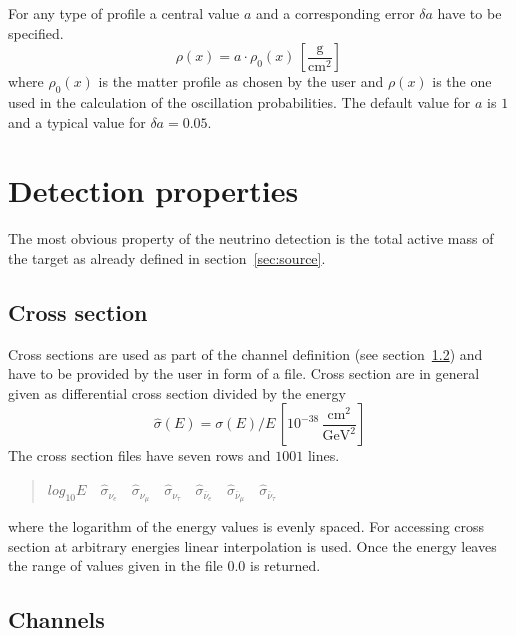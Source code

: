 For any type of profile a central value $a$ and a corresponding error 
$\delta a$ have to be specified.
\begin{equation}
\label{eq:density_error}
\rho(x)=a\cdot\rho_0(x)\,\left[\frac{\mathrm{g}}{\mathrm{cm}^2}\right]\,
\end{equation}
where $\rho_0(x)$ is the matter profile as chosen by the user and $\rho(x)$ is
the one used in the calculation of the oscillation probabilities. The default
value for $a$ is $1$ and a typical value for $\delta a = 0.05$. 


\section{Detection properties}

The most obvious property of the neutrino detection is the total
active mass of the target as already defined in section~\ref{sec:source}.

\subsection{Cross section}
\label{sec:cross_section}

Cross sections are used as part of the 
channel definition 
(see section~\ref{sec:channel}) and have to be provided by the user in form
of a file. Cross section are in general given as differential cross section
divided by the energy
\begin{equation}
\hat\sigma(E)=\sigma(E)/E\,\left[ 10^{-38}\,
\frac{\mathrm{cm}^2}{\mathrm{GeV}^2} \right]
\end{equation}
The cross section files have seven rows and $1001$ lines.
\begin{quotation}
$log_{10} E\quad
\hat\sigma_{\nu_e}\quad
\hat\sigma_{\nu_\mu}\quad
\hat\sigma_{\nu_\tau}\quad
\hat\sigma_{\bar\nu_e}\quad
\hat\sigma_{\bar\nu_\mu}\quad
\hat\sigma_{\bar\nu_\tau}$
\end{quotation}
where the logarithm of the energy values is evenly spaced. 
For accessing cross section at 
arbitrary energies linear interpolation is used. Once the energy leaves the
range of values given in the file $0.0$ is returned.


\subsection{Channels}
\label{sec:channel}

